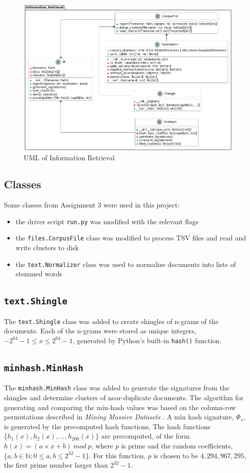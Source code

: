 \documentclass[11pt]{article}
\begin{document}
\begin{figure}[!ht]
  \includegraphics[scale=0.45]{statics/uml.png}
  \centering
  \caption{UML of Information Retrieval}
\end{figure}

\subsection{Classes}
Some classes from Assignment 3 were used in this project:
\begin{itemize}
  \item the driver script \texttt{run.py} was modified with the relevant flags
  \item the \texttt{files.CorpusFile} class was modified to process TSV files and read and write clusters to disk
  \item the \texttt{text.Normalizer} class was used to normalize documents into lists of stemmed words
\end{itemize}

\subsection{\texttt{text.Shingle}}
The \texttt{text.Shingle} class was added to create shingles of n-grams of the documents. Each of the n-grams were stored as unique integers, $-2^{64}-1 \le x \le 2^{64}-1$, generated by Python's built-in \texttt{hash()} function.

\subsection{\texttt{minhash.MinHash}}
The \texttt{minhash.MinHash} class was added to generate the signatures from the shingles and determine clusters of near-duplicate documents. The algorithm for generating and comparing the min-hash values was based on the column-row permutations described in \textit{Mining Massive Datasets} \cite{leskovec_rajaraman_ullman_2022}. A min hash signature, $\Phi_s$, is generated by the precomputed hash functions, The hash functions $\{h_1(x),h_2(x),...,h_{200}(x)\}$ are precomputed, of the form $h(x)=(a \times x + b) \ mod \ p$, where $p$ is prime and the random coefficients, $\{a,b \in \mathbb{N}: 0 \le a,b \le 2^{32}-1\}$. For this function, $p$ is chosen to be $4,294,967,295$, the first prime number larger than $2^{32}-1$.
\end{document}
